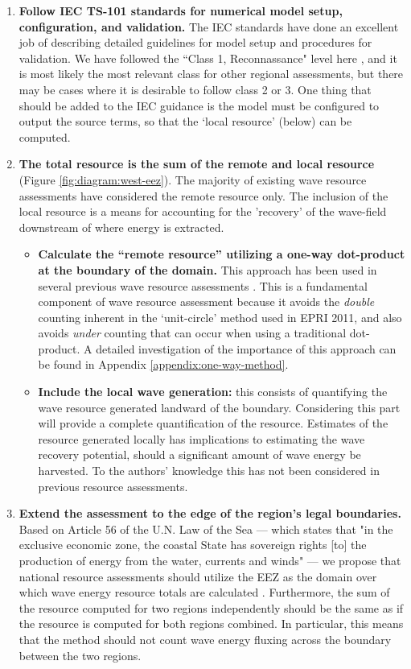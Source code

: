 \begin{enumerate}
\item {\bf Follow IEC TS-101 standards for numerical model setup, configuration, and validation.} The IEC standards have done an excellent job of describing detailed guidelines for model setup and procedures for validation. We have followed the ``Class 1, Reconnassance" level here , and it is most likely the most relevant class for other regional assessments, but there may be cases where it is desirable to follow class 2 or 3. One thing that should be added to the IEC guidance is the model must be configured to output the source terms, so that the `local resource' (below) can be computed.
\item {\bf The total resource is the sum of the remote and local resource} (Figure \ref{fig:diagram:west-eez}). The majority of existing wave resource assessments have considered the remote resource only. The inclusion of the local resource is a means for accounting for the 'recovery' of the wave-field downstream of where energy is extracted.
\begin{itemize}
    \item {\bf Calculate the ``remote resource'' utilizing a one-way dot-product at the boundary of the domain.} This approach has been used in several previous wave resource assessments \citep{gunnQuantifyingGlobalWave2012, hemerRevisedAssessmentAustralia2017}. This is a fundamental component of wave resource assessment because it avoids the {\em double} counting inherent in the `unit-circle' method used in EPRI 2011, and also avoids {\em under} counting that can occur when using a traditional dot-product. A detailed investigation of the importance of this approach can be found in Appendix \ref{appendix:one-way-method}.
    \item {\bf Include the local wave generation:} this consists of quantifying the wave resource generated landward of the boundary. Considering this part will provide a complete quantification of the resource. Estimates of the resource generated locally has implications to estimating the wave recovery potential, should a significant amount of wave energy be harvested. To the authors' knowledge this has not been considered in previous resource assessments.
\end{itemize}
\item {\bf Extend the assessment to the edge of the region's legal boundaries.} Based on Article 56 of the U.N. Law of the Sea — which states that "in the exclusive economic zone, the coastal State has sovereign rights [to] the production of energy from the water, currents and winds" — we propose that national resource assessments should utilize the EEZ as the domain over which wave energy resource totals are calculated \citep{unitednationsgeneralassemblyConventionLawSea1982}. Furthermore, the sum of the resource computed for two regions independently should be the same as if the resource is computed for both regions combined. In particular, this means that the method should not count wave energy fluxing across the boundary between the two regions.
\end{enumerate}

